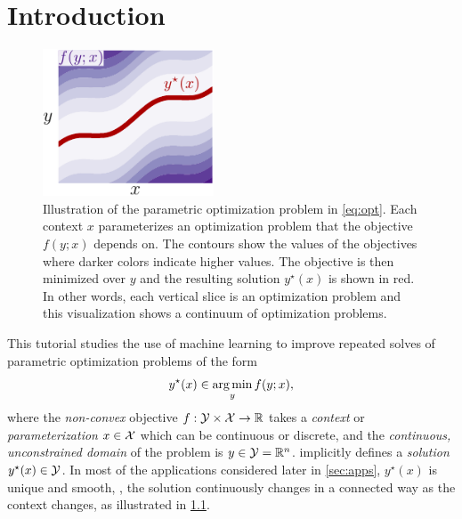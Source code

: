 \chapter{Introduction}
\begin{figure}[t]
\centering
\includegraphics[width=2in]{fig/opt.pdf}
\caption{Illustration of the parametric optimization problem
  in \cref{eq:opt}.
  Each context $x$ parameterizes an
  optimization problem that the objective $f(y; x)$ depends on.
  The contours show the values of the objectives where
  darker colors indicate higher values.
  The objective is then minimized over $y$ and the resulting
  solution $y^\star(x)$ is shown in red.
  In other words, each vertical slice is an optimization problem
  and this visualization shows a continuum of optimization problems.
}
\label{fig:opt}
\end{figure}
This tutorial studies the use of machine learning
to improve repeated solves of parametric optimization
problems of the form
\begin{equation}
  y^\star(x) \in \operatorname*{arg\,min}_y f(y; x),
  \label{eq:opt}
\end{equation}
where the \emph{non-convex} objective
$f: {\mathcal{Y}}\times {\mathcal{X}}\rightarrow \mathbb{R}$
takes a \emph{context} or \emph{parameterization}
$x\in{\mathcal{X}}$ which can be continuous or discrete,
and the \emph{continuous, unconstrained domain} of
the problem is $y\in{\mathcal{Y}}=\mathbb{R}^n$.
 implicitly defines a \emph{solution}
$y^\star(x)\in{\mathcal{Y}}$.
In most of the applications considered later in
\cref{sec:apps}, $y^\star(x)$ is unique and smooth,
\ie, the solution continuously changes in a
connected way as the context changes, as illustrated
in \cref{fig:opt}.

